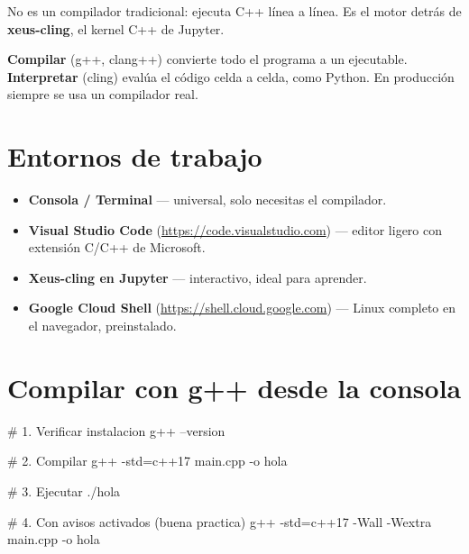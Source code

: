 \documentclass[12pt, oneside]{article}
\begin{document}
No es un compilador tradicional: ejecuta C++ línea a línea.
Es el motor detrás de \textbf{xeus-cling}, el kernel C++ de Jupyter.

\begin{tecnico}
  \textbf{Compilar} (g++, clang++) convierte todo el programa a un ejecutable.
  \textbf{Interpretar} (cling) evalúa el código celda a celda, como Python.
  En producción siempre se usa un compilador real.
\end{tecnico}

\section{Entornos de trabajo}

\begin{itemize}
  \item \textbf{Consola / Terminal} — universal, solo necesitas el compilador.
  \item \textbf{Visual Studio Code} (\url{https://code.visualstudio.com}) —
        editor ligero con extensión C/C++ de Microsoft.
  \item \textbf{Xeus-cling en Jupyter} — interactivo, ideal para aprender.
  \item \textbf{Google Cloud Shell} (\url{https://shell.cloud.google.com}) —
        Linux completo en el navegador,  preinstalado.
\end{itemize}

\section{Compilar con g++ desde la consola}

\begin{ejemplo}
\begin{codigo}[language=bash, numbers=none]
# 1. Verificar instalacion
g++ --version

# 2. Compilar
g++ -std=c++17 main.cpp -o hola

# 3. Ejecutar
./hola

# 4. Con avisos activados (buena practica)
g++ -std=c++17 -Wall -Wextra main.cpp -o hola
\end{codigo}
\end{ejemplo}
\end{document}
